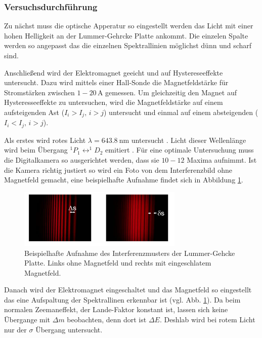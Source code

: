 \subsubsection{Versuchsdurchführung}
Zu nächst muss die optische Apperatur so eingestellt werden das Licht mit einer hohen Helligkeit
an der Lummer-Gehrcke Platte ankommt. Die einzelen Spalte werden so angepasst das die
einzelnen Spektrallinien möglichst dünn und scharf sind.

Anschließend wird der Elektromagnet geeicht und auf Hystereseeffekte untersucht.
Dazu wird mittels einer Hall-Sonde die Magnetfeldstärke für Stromstärken
zwischen $\num{1}-\num{20}\,\si{\ampere}$ gemessen. Um gleichzeitig den Magnet auf Hysteresseeffekte zu untersuchen,
wird die Magnetfeldstärke auf einem aufsteigenden Ast ($I_i>I_j,\, i>j$) untersucht und einmal auf einem absteigenden ($I_i<I_j,\, i>j$).

Als erstes wird rotes Licht $\lambda = \SI{643.8}{\nano\meter}$ untersucht \cite{anleitung27}.
Licht dieser Wellenlänge wird beim Übergang $^1P_1\leftrightarrow ^1\!\!D_2$ emitiert \cite{anleitung27}.
Für eine optimale Untersuchung muss die Digitalkamera so ausgerichtet werden, dass sie $10-12$ Maxima aufnimmt.
Ist die Kamera richtig justiert so wird ein Foto von dem Interferenzbild ohne Magnetfeld gemacht, eine beispielhafte Aufnahme
findet sich in Abbildung \ref{fig: bsp_foto}.
\FloatBarrier
\begin{figure}[h]
  \centering
  \includegraphics[width=0.7\textwidth]{pics/bsp_foto.png}
  \caption{Beispielhafte Aufnahme des Interferenzmusters der Lummer-Gehcke Platte.
  Links ohne Magnetfeld und rechts mit eingeschlatem Magnetfeld\cite{anleitung27}.}
  \label{fig: bsp_foto}
\end{figure}
\FloatBarrier
Danach wird der Elektromagnet eingeschaltet und das Magnetfeld so eingestellt das eine Aufspaltung der
Spektrallinen erkennbar ist (vgl. Abb. \ref{fig: bsp_foto}). Da beim normalen Zeemaneffekt, der Lande-Faktor konstant ist, lassen sich keine
Übergange mit $\Delta m$ beobachten, denn dort ist $\Delta E$. Deshlab wird bei rotem Licht nur
der $\sigma$ Übergang untersucht.


